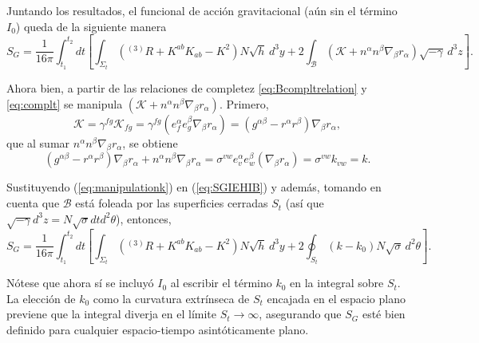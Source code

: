 Juntando los resultados, el funcional de acci\'{o}n gravitacional (a\'{u}n sin el t\'{e}rmino $I_{0}$) queda de la siguiente manera
%
\begin{equation}
\label{eq:SGIEHIB}
S_{G} = \frac{1}{16 \pi} \int^{t_{2}}_{t_{1}} dt \left[ \int_{\Sigma_{t}} (^{(3)}R + K^{ab} K_{ab} - K^{2}) N \sqrt{h} \, d^{3} y + 2 \int_{\mathcal{B}} (\mathcal{K} + n^{\alpha} n^{\beta} \nabla_{\beta} r_{\alpha}) \sqrt{-\gamma} \, d^{3} z\right].
\end{equation}

Ahora bien, a partir de las relaciones de completez \eqref{eq:Bcompltrelation} y \eqref{eq:complt} se manipula $(\mathcal{K} + n^{\alpha} n^{\beta} \nabla_{\beta} r_{\alpha})$. Primero,
%
\begin{equation}
\mathcal{K} = \gamma^{fg} \mathcal{K}_{fg} = \gamma^{fg} (e^{\alpha}_{f} e^{\beta}_{g} \nabla_{\beta} r_{\alpha}) = (g^{\alpha \beta} - r^{\alpha} r^{\beta}) \nabla_{\beta} r_{\alpha},
\end{equation}
%
que al sumar $n^{\alpha} n^{\beta} \nabla_{\beta} r_{\alpha}$, se obtiene
%
\begin{equation}
\label{eq:manipulationk}
(g^{\alpha \beta} - r^{\alpha} r^{\beta}) \nabla_{\beta} r_{\alpha} + n^{\alpha} n^{\beta} \nabla_{\beta} r_{\alpha} = \sigma^{vw} e^{\alpha}_{v} e^{\beta}_{w} (\nabla_{\beta} r_{\alpha}) = \sigma^{vw} k_{vw} = k.
\end{equation}

Sustituyendo (\ref{eq:manipulationk}) en (\ref{eq:SGIEHIB}) y adem\'{a}s, tomando en cuenta que $\mathcal{B}$ est\'{a} foleada por las superficies cerradas $S_{t}$ (as\'{i} que $\sqrt{-\gamma} d^{3} z = N \sqrt{\sigma} dt d^{2} \theta$), entonces,
%
\begin{equation}
\label{eq:LagSg}
S_{G} = \frac{1}{16 \pi} \int^{t_{2}}_{t_{1}} dt \left[ \int_{\Sigma_{t}} (^{(3)}R + K^{ab} K_{ab} - K^{2}) N \sqrt{h} \, d^{3} y + 2 \oint_{S_{t}} (k - k_{0}) N \sqrt{\sigma} \, d^{2} \theta \right].
\end{equation}

N\'{o}tese que ahora s\'{i} se incluy\'{o} $I_{0}$ al escribir el t\'{e}rmino $k_{0}$ en la integral sobre $S_{t}$. La elecci\'{o}n de $k_{0}$ como la curvatura extr\'{i}nseca de $S_{t}$ encajada en el espacio plano previene que la integral diverja en el l\'{i}mite $S_{t} \rightarrow \infty$, asegurando que $S_{G}$ est\'{e} bien definido para cualquier espacio-tiempo asint\'{o}ticamente plano.